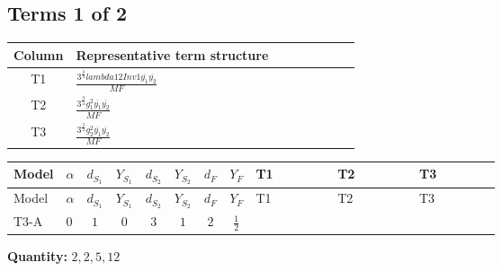 \documentclass[8pt]{article}
\begin{document}
\begin{landscape}
\subsection*{Terms 1 of 2}
\begin{center}
\begin{tabular}{@{}c >{\raggedright\arraybackslash}p{0.82\linewidth}@{}}
\toprule
Column & Representative term structure \\
\midrule
T1 & \(\displaystyle \frac{3^{\frac{3}{4}} lambda12Inv1 \overline{y_{1}} \overline{y_{2}}}{MF}\) \\
\midrule
T2 & \(\displaystyle \frac{3^{\frac{3}{4}} g_{1}^{2} \overline{y_{1}} \overline{y_{2}}}{MF}\) \\
\midrule
T3 & \(\displaystyle \frac{3^{\frac{3}{4}} g_{2}^{2} \overline{y_{1}} \overline{y_{2}}}{MF}\) \\
\midrule
\bottomrule
\end{tabular}
\end{center}
\smallskip
\tiny
\begin{longtable}{@{}llcccccc >{\raggedright\arraybackslash}p{0.21\linewidth} >{\raggedright\arraybackslash}p{0.21\linewidth} >{\raggedright\arraybackslash}p{0.21\linewidth}@{}}
\toprule
Model & $\alpha$ & $d_{S_1}$ & $Y_{S_1}$ & $d_{S_2}$ & $Y_{S_2}$ & $d_F$ & $Y_F$ & T1 & T2 & T3 \\
\midrule
\endfirsthead
\toprule
Model & $\alpha$ & $d_{S_1}$ & $Y_{S_1}$ & $d_{S_2}$ & $Y_{S_2}$ & $d_F$ & $Y_F$ & T1 & T2 & T3 \\
\midrule
\endhead
T3-A & $0$ & $1$ & $0$ & $3$ & $1$ & $2$ & $\frac{1}{2}$ & \scriptsize\adjustbox{max width=\linewidth}{$\begin{gathered} \frac{3^{\frac{3}{4}} lambda12Inv1 \overline{y_{1}} \overline{y_{2}}}{6 MF}\end{gathered}$} & \scriptsize\adjustbox{max width=\linewidth}{$\begin{gathered} \frac{3^{\frac{3}{4}} g_{1}^{2} \overline{y_{1}} \overline{y_{2}}}{8 MF}\end{gathered}$} & \scriptsize\adjustbox{max width=\linewidth}{$\begin{gathered} \frac{11 \cdot 3^{\frac{3}{4}} g_{2}^{2} \overline{y_{1}} \overline{y_{2}}}{8 MF}\end{gathered}$} \\
\midrule
\bottomrule
\end{longtable}
\clearpage
\noindent\textbf{Quantity: }$\mathrm{2,2,5,12}$\par\smallskip

\end{landscape}
\end{document}
